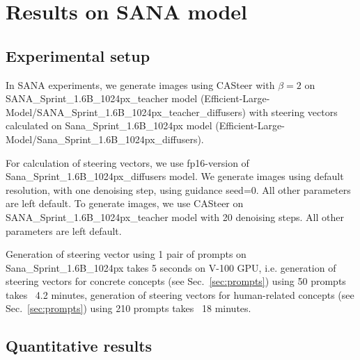 

% 



\clearpage
\section{Results on SANA model}
\label{sec:sana_res}

\subsection{Experimental setup}

In SANA experiments, we generate images using CASteer with $\beta=2$ on SANA\_Sprint\_1.6B\_1024px\_teacher model (Efficient-Large-Model/SANA\_Sprint\_1.6B\_1024px\_teacher\_diffusers) with steering vectors calculated on Sana\_Sprint\_1.6B\_1024px model (Efficient-Large-Model/Sana\_Sprint\_1.6B\_1024px\_diffusers).

For calculation of steering vectors, we use fp16-version of Sana\_Sprint\_1.6B\_1024px\_diffusers model. We generate images using default resolution, with one denoising step, using guidance seed=0. All other parameters are left default. To generate images, we use CASteer on SANA\_Sprint\_1.6B\_1024px\_teacher model with 20 denoising steps. All other parameters are left default.

Generation of steering vector using 1 pair of prompts on Sana\_Sprint\_1.6B\_1024px takes 5 seconds on V-100 GPU, i.e. generation of steering vectors for concrete concepts (see Sec.~\ref{sec:prompts}) using 50 prompts takes ~4.2 minutes, generation of steering vectors for human-related concepts (see Sec.~\ref{sec:prompts}) using 210 prompts takes ~18 minutes.

\subsection{Quantitative results}

